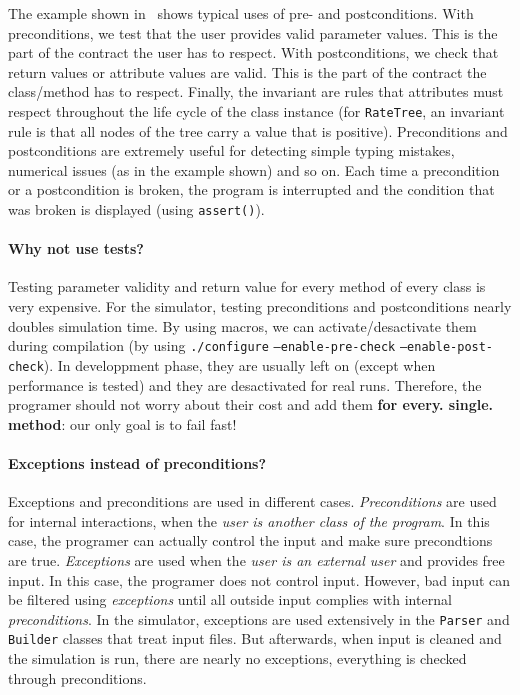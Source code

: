 The example shown in~ shows typical uses of pre- and postconditions. With preconditions, we test that the user provides valid parameter values. This is the part of the contract the user has to respect. With postconditions, we check that return values or attribute values are valid. This is the part of the contract the class/method has to respect. Finally, the invariant are rules that attributes must respect throughout the life cycle of the class instance (for \texttt{RateTree}, an invariant rule is that all nodes of the tree carry a value that is positive). Preconditions and postconditions are extremely useful for detecting simple typing mistakes, numerical issues (as in the example shown) and so on. Each time a precondition or a postcondition is broken, the program is interrupted and the condition that was broken is displayed (using \texttt{assert()}).

\paragraph{Why not use tests?} Testing parameter validity and return value for every method of every class is very expensive. For the simulator, testing preconditions and postconditions nearly doubles simulation time. By using macros, we can activate/desactivate them during compilation (by using \texttt{./configure} \texttt{--enable-pre-check} \texttt{--enable-post-check}). In developpment phase, they are usually left on (except when performance is tested) and they are desactivated for real runs. Therefore, the programer should not worry about their cost and add them \textbf{for every. single. method}: our only goal is to fail fast!

\paragraph{Exceptions instead of preconditions?} Exceptions and preconditions are used in different cases. \emph{Preconditions} are used for internal interactions, when the \emph{user is another class of the program}. In this case, the programer can actually control the input and make sure precondtions are true. \emph{Exceptions} are used when the \emph{user is an external user} and provides free input. In this case, the programer does not control input. However, bad input can be filtered using \emph{exceptions} until all outside input complies with internal \emph{preconditions}. In the simulator, exceptions are used extensively in the \texttt{Parser} and \texttt{Builder} classes that treat input files. But afterwards, when input is cleaned and the simulation is run, there are nearly no exceptions, everything is checked through preconditions.

